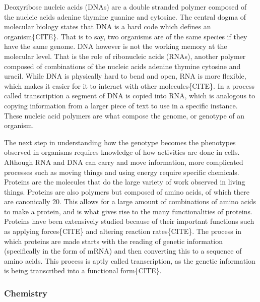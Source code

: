 \documentclass[draft, english]{volcanica-template}
\begin{document}
Deoxyribose nucleic acids (DNAs) are a double stranded polymer composed of the nucleic acids adenine thymine guanine and cytosine. The central dogma of molecular biology states that DNA is a hard code which defines an organism\{CITE\}. That is to say, two organisms are of the same species if they have the same genome. DNA however is not the working memory at the molecular level. That is the role of ribonucleic acids (RNAs), another polymer composed of combinations of the nucleic acids adenine thymine cytosine and uracil. While DNA is physically hard to bend and open, RNA is more flexible, which makes it easier for it to interact with other molecules\{CITE\}. In a process called transcription a segment of DNA is copied into RNA, which is analogous to copying information from a larger piece of text to use in a specific instance. These nucleic acid polymers are what compose the genome, or genotype of an organism.

The next step in understanding how the genotype becomes the phenotypes observed in organisms requires knowledge of how activities are done in cells. Although RNA and DNA can carry and move information, more complicated processes such as moving things and using energy require specific chemicals. Proteins are the molecules that do the large variety of work observed in living things. Proteins are also polymers but composed of amino acids, of which there are canonically 20. This allows for a large amount of combinations of amino acids to make a protein, and is what gives rise to the many functionalities of proteins. Proteins have been extensively studied because of their important functions such as applying forces\{CITE\} and altering reaction rates\{CITE\}. The process in which proteins are made starts with the reading of genetic information (specifically in the form of mRNA) and then converting this to a sequence of amino acids. This process is aptly called transcription, as the genetic information is being transcribed into a functional form\{CITE\}.

\subsubsection{Chemistry}
\end{document}
